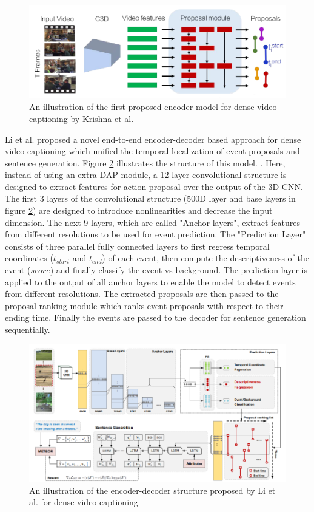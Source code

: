 \documentclass[preprint, 12pt]{elsarticle}
\begin{document}
		\begin{figure}[H]
			\centering
			\includegraphics[scale=0.4]{Imgs/dense1.png}
			\caption{An illustration of the first proposed encoder model for dense video captioning by Krishna et al. \cite{krishna2017dense}}
			\label{fig:dense1}
		\end{figure}
	
		Li et al. \cite{li2018jointly} proposed a novel end-to-end encoder-decoder based approach for dense video captioning which unified the temporal localization of event proposals and sentence generation\cite{li2018jointly}. Figure \ref{fig:dense2} illustrates the structure of this model. \cite{li2018jointly}. Here, instead of using an extra DAP module, a 12 layer convolutional structure is designed to extract features for action proposal over the output of the 3D-CNN. The first 3 layers of the convolutional structure (500D layer and base layers in figure \ref{fig:dense2}) are designed to introduce nonlinearities and decrease the input dimension. The next 9 layers, which are called "Anchor layers", extract features from different resolutions to be used for event prediction. The "Prediction Layer" consists of three parallel fully connected layers to first regress temporal coordinates ($t_{start}$ and $t_{end}$) of each event, then compute the descriptiveness of the event ($score$) and finally classify the event vs background. The prediction layer is applied to the output of all anchor layers to enable the model to detect events from different resolutions. The extracted proposals are then passed to the proposal ranking module which ranks event proposals with respect to their ending time. Finally the events are passed to the decoder for sentence generation sequentially.
		
		\begin{figure}[H]
			\centering
			\includegraphics[scale=0.5]{Imgs/dense2.png}
			\caption{An illustration of the encoder-decoder structure proposed by Li et al. for dense video captioning \cite{li2018jointly}}
			\label{fig:dense2}
		\end{figure}
	
\end{document}
